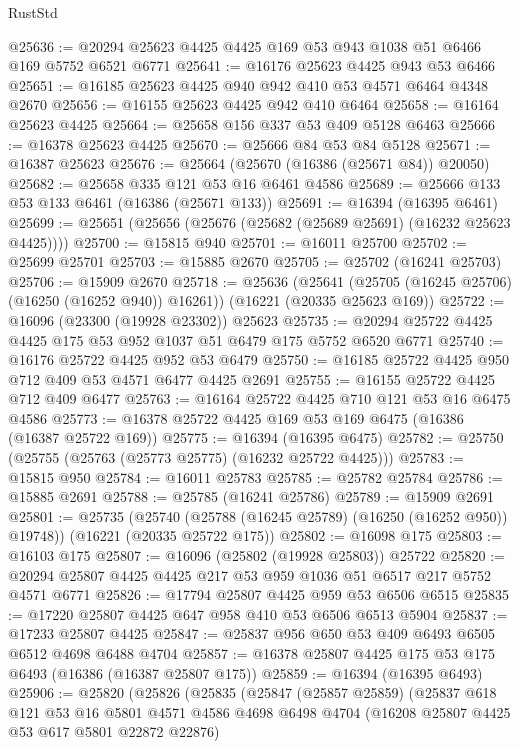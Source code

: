 \begin{lexlean}{RustStd}
\begin{coremodule}
@25636 := @20294 @25623 @4425 @4425 @169 @53 @943 @1038 @51 @6466 @169 @5752 @6521 @6771
@25641 := @16176 @25623 @4425 @943 @53 @6466
@25651 := @16185 @25623 @4425 @940 @942 @410 @53 @4571 @6464 @4348 @2670
@25656 := @16155 @25623 @4425 @942 @410 @6464
@25658 := @16164 @25623 @4425
@25664 := @25658 @156 @337 @53 @409 @5128 @6463
@25666 := @16378 @25623 @4425
@25670 := @25666 @84 @53 @84 @5128
@25671 := @16387 @25623
@25676 := @25664 (@25670 (@16386 (@25671 @84)) @20050)
@25682 := @25658 @335 @121 @53 @16 @6461 @4586
@25689 := @25666 @133 @53 @133 @6461 (@16386 (@25671 @133))
@25691 := @16394 (@16395 @6461)
@25699 := @25651 (@25656 (@25676 (@25682 (@25689 @25691) (@16232 @25623 @4425))))
@25700 := @15815 @940
@25701 := @16011 @25700
@25702 := @25699 @25701
@25703 := @15885 @2670
@25705 := @25702 (@16241 @25703)
@25706 := @15909 @2670
@25718 := @25636
    (@25641 (@25705 (@16245 @25706) (@16250 (@16252 @940)) @16261))
    (@16221 (@20335 @25623 @169))
@25722 := @16096 (@23300 (@19928 @23302)) @25623
@25735 := @20294 @25722 @4425 @4425 @175 @53 @952 @1037 @51 @6479 @175 @5752 @6520 @6771
@25740 := @16176 @25722 @4425 @952 @53 @6479
@25750 := @16185 @25722 @4425 @950 @712 @409 @53 @4571 @6477 @4425 @2691
@25755 := @16155 @25722 @4425 @712 @409 @6477
@25763 := @16164 @25722 @4425 @710 @121 @53 @16 @6475 @4586
@25773 := @16378 @25722 @4425 @169 @53 @169 @6475 (@16386 (@16387 @25722 @169))
@25775 := @16394 (@16395 @6475)
@25782 := @25750 (@25755 (@25763 (@25773 @25775) (@16232 @25722 @4425)))
@25783 := @15815 @950
@25784 := @16011 @25783
@25785 := @25782 @25784
@25786 := @15885 @2691
@25788 := @25785 (@16241 @25786)
@25789 := @15909 @2691
@25801 := @25735
    (@25740 (@25788 (@16245 @25789) (@16250 (@16252 @950)) @19748))
    (@16221 (@20335 @25722 @175))
@25802 := @16098 @175
@25803 := @16103 @175
@25807 := @16096 (@25802 (@19928 @25803)) @25722
@25820 := @20294 @25807 @4425 @4425 @217 @53 @959 @1036 @51 @6517 @217 @5752 @4571 @6771
@25826 := @17794 @25807 @4425 @959 @53 @6506 @6515
@25835 := @17220 @25807 @4425 @647 @958 @410 @53 @6506 @6513 @5904
@25837 := @17233 @25807 @4425
@25847 := @25837 @956 @650 @53 @409 @6493 @6505 @6512 @4698 @6488 @4704
@25857 := @16378 @25807 @4425 @175 @53 @175 @6493 (@16386 (@16387 @25807 @175))
@25859 := @16394 (@16395 @6493)
@25906 := @25820
    (@25826
      (@25835
        (@25847
          (@25857 @25859)
          (@25837
            @618
            @121
            @53
            @16
            @5801
            @4571
            @4586
            @4698
            @6498
            @4704
            (@16208 @25807 @4425 @53 @617 @5801 @22872 @22876)

\end{coremodule}
\end{lexlean}
